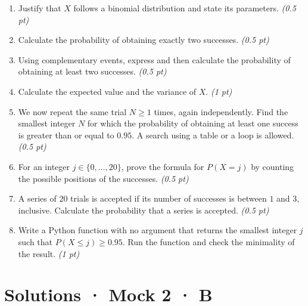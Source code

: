 \begin{enumerate}

\item Justify that $X$ follows a binomial distribution and state its parameters. \hfill\textit{(0.5 pt)}

\item Calculate the probability of obtaining exactly two successes. \hfill\textit{(0.5 pt)}

\item Using complementary events, express and then calculate the probability of obtaining at least two successes. \hfill\textit{(0.5 pt)}

\item Calculate the expected value and the variance of $X$. \hfill\textit{(1 pt)}

\item We now repeat the same trial $N\ge1$ times, again independently. Find the smallest integer $N$ for which the probability of obtaining at least one success is greater than or equal to $\num{0,95}$. A search using a table or a loop is allowed. \hfill\textit{(0.5 pt)}

\item For an integer $j\in\{0,\ldots,20\}$, prove the formula for $P(X=j)$ by counting the possible positions of the successes. \hfill\textit{(0.5 pt)}

\item A series of $20$ trials is accepted if its number of successes is between $1$ and $3$, inclusive. Calculate the probability that a series is accepted. \hfill\textit{(0.5 pt)}

\item Write a Python function with no argument that returns the smallest integer $j$ such that $P(X\le j)\ge\num{0,95}$. Run the function and check the minimality of the result. \hfill\textit{(1 pt)}

\end{enumerate}

\ifmxteacher\mxnewpage

\section*{Solutions · Mock 2 · B}\label{cor:8-4}

